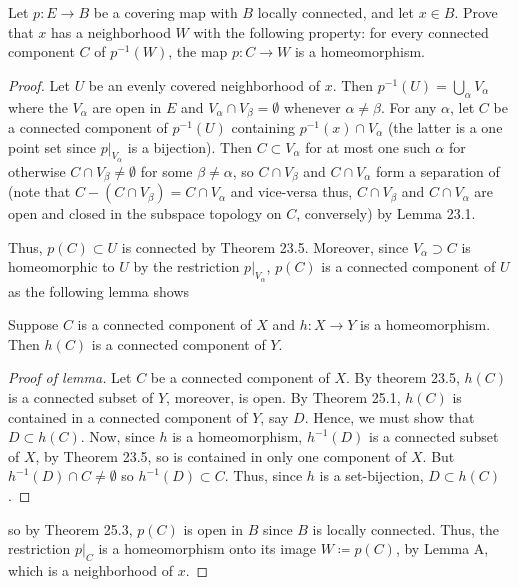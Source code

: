 \begin{problem}
Let $p\colon E\to B$ be a covering map with $B$ locally connected, and let
$x\in B$. Prove that $x$ has a neighborhood $W$ with the following
property: for every connected component $C$ of $p^{-1}(W)$, the map
$p\colon C\to W$ is a homeomorphism.
\end{problem}
\begin{proof}
Let $U$ be an evenly covered neighborhood of $x$. Then
$p^{-1}(U)=\bigcup_\alpha V_\alpha$ where the $V_\alpha$ are open in $E$
and  $V_\alpha\cap V_\beta=\emptyset$ whenever $\alpha\neq\beta$. For any
$\alpha$, let $C$ be a connected component of $p^{-1}(U)$ containing
$p^{-1}(x)\cap V_\alpha$ (the latter is a one point set since
$\left.p\right|_{V_\alpha}$ is a bijection). Then $C\subset V_\alpha$ for
at most one such $\alpha$ for otherwise $C\cap V_\beta\neq\emptyset$ for
some $\beta\neq\alpha$, so $C\cap V_\beta$ and $C\cap V_\alpha$ form a
separation of (note that $C\minus(C\cap V_\beta)=C\cap V_\alpha$ and
vice-versa thus, $C\cap V_\beta$ and $C\cap V_\alpha$ are open and closed
in the subspace topology on $C$, conversely) by Lemma 23.1.

Thus, $p(C)\subset U$ is connected by Theorem 23.5. Moreover, since
$V_\alpha\supset C$ is homeomorphic to $U$ by the restriction
$\left.p\right|_{V_\alpha}$, $p(C)$ is a connected component of $U$ as the
following lemma shows
\begin{lemma}
Suppose $C$ is a connected component of $X$ and $h\colon X\to Y$ is a
homeomorphism. Then $h(C)$ is a connected component of $Y$.
\end{lemma}
\begin{proof}[Proof of lemma]
\renewcommand\qedsymbol{$\clubsuit$}
Let $C$ be a connected component of $X$. By theorem 23.5, $h(C)$ is a
connected subset of $Y$, moreover, is open. By Theorem 25.1, $h(C)$ is
contained in a connected component of $Y$, say $D$. Hence, we must show
that $D\subset h(C)$. Now, since $h$ is a homeomorphism, $h^{-1}(D)$ is a
connected subset of $X$, by Theorem 23.5, so is contained in only one
component of $X$. But $h^{-1}(D)\cap C\neq\emptyset$ so $h^{-1}(D)\subset
C$. Thus, since $h$ is a set-bijection, $D\subset h(C)$.
\end{proof}
so by Theorem 25.3, $p(C)$ is open in $B$ since $B$ is locally
connected. Thus, the restriction $\left.p\right|_{C}$ is a homeomorphism
onto its image $W\coloneqq p(C)$, by Lemma A, which is a neighborhood of $x$.
\end{proof}

